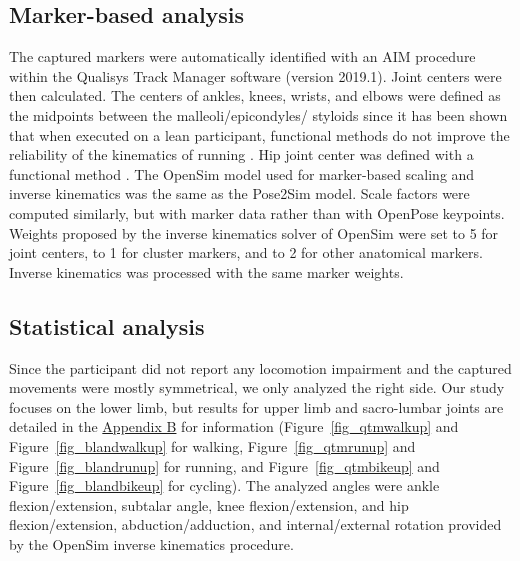 \subsection{Marker-based analysis}

The captured markers were automatically identified with an AIM procedure within the Qualisys Track Manager software (version 2019.1). Joint centers were then calculated. The centers of ankles, knees, wrists, and elbows were defined as the midpoints between the malleoli/epicondyles/
styloids since it has been shown that when executed on a lean participant, functional methods do not improve the reliability of the kinematics of running \cite{Pohl2010}. Hip joint center was defined with a functional method \cite{Halvorsen2003}. The OpenSim model used for marker-based scaling and inverse kinematics was the same as the Pose2Sim model. Scale factors were computed similarly, but with marker data rather than with OpenPose keypoints. Weights proposed by the inverse kinematics solver of OpenSim were set to 5 for joint centers, to 1 for cluster markers, and to 2 for other anatomical markers. Inverse kinematics was processed with the same marker weights.


\subsection{Statistical analysis} \label{stats_accuracy}

Since the participant did not report any locomotion impairment and the captured movements were mostly symmetrical, we only analyzed the right side. Our study focuses on the lower limb, but results for upper limb and sacro-lumbar joints are detailed in the \hyperref[Ann:2]{Appendix B} for information (Figure~\ref{fig_qtmwalkup} and Figure~\ref{fig_blandwalkup} for walking, Figure~\ref{fig_qtmrunup} and Figure~\ref{fig_blandrunup} for running, and Figure~\ref{fig_qtmbikeup} and Figure~\ref{fig_blandbikeup} for cycling). The analyzed angles were ankle flexion/extension, subtalar angle, knee flexion/extension, and hip flexion/extension, abduction/adduction, and internal/external rotation provided by the OpenSim inverse kinematics procedure.

